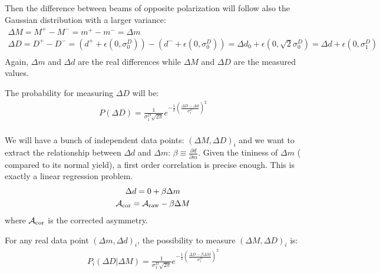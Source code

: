 Then the difference between beams of opposite polarization will follow also
the Gaussian distribution with a larger variance:
\begin{equation}
    \begin{gathered}
	\Delta M = M^+ - M^- = m^+ - m^- = \Delta m   \\
	\Delta D = D^+ - D^- = (d^+ + \epsilon(0, \sigma_0^D)) - (d^- + \epsilon(0, \sigma_0^D))
	    = \Delta d_0 + \epsilon(0, \sqrt{2}\sigma_0^D)
	    = \Delta d + \epsilon(0, \sigma_1^D) \\
    \end{gathered}
\end{equation}
Again, $\Delta m$ and $\Delta d$ are the real differences
while $\Delta M$ and $\Delta D$ are the measured values.

The probability for measuring $\Delta D$ will be:
\begin{equation}
    \begin{gathered}
	P(\Delta D) = \frac{1}{\sigma_1^D\sqrt{2\pi}} e^{-\frac{1}{2}\left( \frac{\Delta D - \Delta d}{\sigma_1^D}\right)^2}    \\
    \end{gathered}
\end{equation}

We will have a bunch of independent data points: $(\Delta M, \Delta D)_i$ and 
we want to extract the relationship between $\Delta d$ and $\Delta m$: 
$\beta \equiv \frac{\partial d}{\partial m}$. Given the tininess of $\Delta m$ (
compared to its normal yield), a first order correlation is precise enough. 
This is exactly a linear regression problem.
\begin{equation}
    \begin{gathered}
	\Delta d = 0 + \beta \Delta m	\\
	\mathcal{A}_{\text{cor}} = \mathcal{A}_{\text{raw}} - \beta\Delta M	\\
    \end{gathered}
    \label{eq:first_order_correlation}
\end{equation}
where $\mathcal{A}_{\text{cor}}$ is the corrected asymmetry.

For any real data point $(\Delta m, \Delta d)_i$, the possibility to measure
$(\Delta M, \Delta D)_i$ is:
\begin{equation}
    \begin{gathered}
	P_i(\Delta D|\Delta M) = \frac{1}{\sigma_1^D\sqrt{2\pi}} 
	    e^{-\frac{1}{2}\left( \frac{\Delta D - \beta\Delta M}{\sigma_1^D}\right)^2}
    \end{gathered}
\end{equation}

